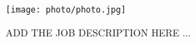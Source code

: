 \documentclass[a4paper,11pt]{article} %
\begin{document}




\begin{minipage}[c]{0.15\textwidth} %
    \texttt{[image: photo/photo.jpg]} %
\end{minipage}%
\hfill
\begin{minipage}[c]{0.82\textwidth} %
    
\end{minipage}

\vspace{0.5cm}












{\color{white}
\fontsize{1pt}{1pt}\selectfont
ADD THE JOB DESCRIPTION HERE ...
}
\end{document}
